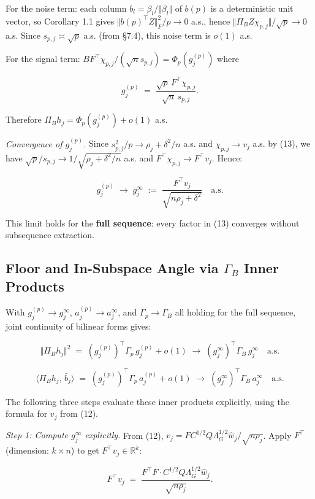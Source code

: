\documentclass{article}
\theoremstyle{remark}
\begin{document}
For the noise term: each column $b_l = \beta_l/\Vert \beta_l\Vert $ of $b(p)$ is a deterministic unit vector, so Corollary 1.1 gives $\Vert b(p)^\top Z\Vert_F^2/p \to 0$ a.s., hence $\Vert \Pi_B Z\chi_{p,j}\Vert /\sqrt{p} \to 0$ a.s. Since $s_{p,j} \asymp \sqrt{p}$ a.s. (from §7.4), this noise term is $o(1)$ a.s.

For the signal term: $BF^\top\chi_{p,j}/(\sqrt{n}s_{p,j}) = \Phi_p(g_j^{(p)})$ where

\[
g_j^{(p)} \;=\; \frac{\sqrt{p}\,F^\top\chi_{p,j}}{\sqrt{n}\,s_{p,j}}.
\]

Therefore $\Pi_B h_j = \Phi_p(g_j^{(p)}) + o(1)$ a.s.

\textit{Convergence of $g_j^{(p)}$.} Since $s_{p,j}^2/p \to \rho_j + \delta^2/n$ a.s. and $\chi_{p,j} \to v_j$ a.s. by (13), we have $\sqrt{p}/s_{p,j} \to 1/\sqrt{\rho_j + \delta^2/n}$ a.s. and $F^\top\chi_{p,j} \to F^\top v_j$. Hence:

\[
g_j^{(p)} \;\longrightarrow\; g_j^\infty \;:=\; \frac{F^\top v_j}{\sqrt{n\rho_j + \delta^2}} \quad\text{a.s.}
\]

This limit holds for the \textbf{full sequence}: every factor in (13) converges without subsequence extraction.

\subsection{Floor and In-Subspace Angle via $\Gamma_B$ Inner Products}

With $g_j^{(p)} \to g_j^\infty$, $a_j^{(p)} \to a_j^\infty$, and $\Gamma_p \to \Gamma_B$ all holding for the full sequence, joint continuity of bilinear forms gives:

\[
\Vert \Pi_B h_j\Vert^2 \;=\; (g_j^{(p)})^\top\Gamma_p\,g_j^{(p)} + o(1) \;\longrightarrow\; (g_j^\infty)^\top\Gamma_B\,g_j^\infty \quad\text{a.s.}
\]

\[
\langle\Pi_B h_j,\,\bar{b}_j\rangle \;=\; (g_j^{(p)})^\top\Gamma_p\,a_j^{(p)} + o(1) \;\longrightarrow\; (g_j^\infty)^\top\Gamma_B\,a_j^\infty \quad\text{a.s.}
\]

The following three steps evaluate these inner products explicitly, using the formula for $v_j$ from (12).

\textit{Step 1: Compute $g_j^\infty$ explicitly.} From (12), $v_j = FC^{1/2}Q\Lambda_G^{1/2}\hat{w}_j/\sqrt{n\rho_j}$. Apply $F^\top$ (dimension: $k\times n$) to get $F^\top v_j \in \mathbb{R}^k$:

\[
F^\top v_j \;=\; \frac{F^\top F\cdot C^{1/2}Q\Lambda_G^{1/2}\hat{w}_j}{\sqrt{n\rho_j}}.
\]
\end{document}

